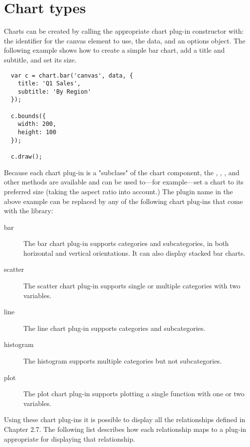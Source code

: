 \chapter{Chart types}
Charts can be created by calling the appropriate chart plug-in constructor with: the identifier for the canvas element to use, the data, and an options object. The following example shows how to create a simple bar chart, add a title and subtitle, and set its size.
\begin{verbatim}
  var c = chart.bar('canvas', data, {
    title: 'Q1 Sales',
    subtitle: 'By Region'
  });

  c.bounds({
    width: 200,
    height: 100
  });

  c.draw();
\end{verbatim}

Because each chart plug-in is a "subclass" of the chart component, the , , , and other methods are available and can be used to---for example---set a chart to its preferred size (taking the aspect ratio into account.) The  plugin name in the above example can be replaced by any of the following chart plug-ins that come with the library:

\begin{description}
\item[bar] The bar chart plug-in supports categories and subcategories, in both horizontal and vertical orientations. It can also display stacked bar charts.
\item[scatter] The scatter chart plug-in supports single or multiple categories with two variables.
\item[line] The line chart plug-in supports categories and subcategories.
\item[histogram] The histogram supports multiple categories but not subcategories.
\item[plot] The plot chart plug-in supports plotting a single function with one or two variables.
\end{description}

Using these chart plug-ins it is possible to display all the relationships defined in Chapter 2.7. The following list describes how each relationship maps to a plug-in appropriate for displaying that relationship.

